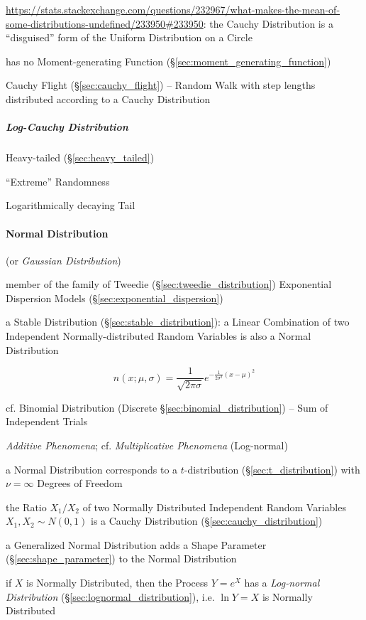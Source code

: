 \url{https://stats.stackexchange.com/questions/232967/what-makes-the-mean-of-some-distributions-undefined/233950#233950}:
the Cauchy Distribution is a ``disguised'' form of the Uniform Distribution on a
Circle

has no Moment-generating Function (\S\ref{sec:moment_generating_function})

Cauchy Flight (\S\ref{sec:cauchy_flight}) -- Random Walk with step lengths
distributed according to a Cauchy Distribution



\subparagraph{Log-Cauchy Distribution}\label{sec:log_cauchy}\hfill

Heavy-tailed (\S\ref{sec:heavy_tailed})

``Extreme'' Randomness

Logarithmically decaying Tail



\paragraph{Normal Distribution}\label{sec:normal_distribution}\hfill

(or \emph{Gaussian Distribution})

member of the family of Tweedie (\S\ref{sec:tweedie_distribution}) Exponential
Dispersion Models (\S\ref{sec:exponential_dispersion})

a Stable Distribution (\S\ref{sec:stable_distribution}): a Linear Combination of
two Independent Normally-distributed Random Variables is also a Normal
Distribution

\[
  n (x; \mu, \sigma) =
  \frac{1}{\sqrt{2\pi \sigma}} e^{-\frac{1}{2 \sigma^2}(x - \mu)^2}
\]

cf. Binomial Distribution (Discrete \S\ref{sec:binomial_distribution})
-- Sum of Independent Trials

\emph{Additive Phenomena}; cf. \emph{Multiplicative Phenomena} (Log-normal)

a Normal Distribution corresponds to a $t$-distribution
(\S\ref{sec:t_distribution}) with $\nu = \infty$ Degrees of Freedom

the Ratio $X_1/X_2$ of two Normally Distributed Independent Random Variables
$X_1, X_2 \sim N(0,1)$ is a Cauchy Distribution
(\S\ref{sec:cauchy_distribution})

\fist a Generalized Normal Distribution adds a Shape Parameter
(\S\ref{sec:shape_parameter}) to the Normal Distribution

if $X$ is Normally Distributed, then the Process $Y = e^X$ has a
\emph{Log-normal Distribution} (\S\ref{sec:lognormal_distribution}), i.e. $\ln Y
= X$ is Normally Distributed

